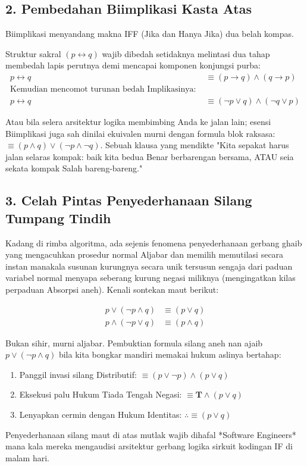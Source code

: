 \subsection{2. Pembedahan Biimplikasi Kasta Atas}

Biimplikasi menyandang makna IFF (Jika dan Hanya Jika) dua belah kompas. 

\begin{teorema}
Struktur sakral $(p \leftrightarrow q)$ wajib dibedah setidaknya melintasi dua tahap membedah lapis perutnya demi mencapai komponen konjungsi purba: 
\begin{align*}
    p \leftrightarrow q &\equiv (p \rightarrow q) \wedge (q \rightarrow p) \\
    \text{Kemudian mencomot turunan bedah Implikasinya: } & \\
    p \leftrightarrow q &\equiv (\neg p \vee q) \wedge (\neg q \vee p)
\end{align*}
\end{teorema}
Atau bila selera arsitektur logika membimbing Anda ke jalan lain; esensi Biimplikasi juga sah dinilai ekuivalen murni dengan formula blok raksasa: $\equiv (p \wedge q) \vee (\neg p \wedge \neg q)$. Sebuah klausa yang mendikte "Kita sepakat harus jalan selaras kompak: baik kita bedua Benar berbarengan bersama, ATAU seia sekata kompak Salah bareng-bareng."

\subsection{3. Celah Pintas Penyederhanaan Silang Tumpang Tindih}

Kadang di rimba algoritma, ada sejenis fenomena penyederhanaan gerbang ghaib yang mengacuhkan prosedur normal Aljabar dan memilih memutilasi secara instan manakala susunan kurungnya secara unik tersusun sengaja dari paduan variabel normal menyapa seberang kurung negasi miliknya (mengingatkan kilas perpaduan Absorpsi aneh). Kenali sontekan maut berikut:

\begin{align*}
    p \vee (\neg p \wedge q) &\equiv (p \vee q) \\
    p \wedge (\neg p \vee q) &\equiv (p \wedge q)
\end{align*}

Bukan sihir, murni aljabar. Pembuktian formula silang aneh nan ajaib $p \vee (\neg p \wedge q)$ bila kita bongkar mandiri memakai hukum aslinya bertahap:
\begin{enumerate}
    \item Panggil invasi silang Distributif: $\equiv (p \vee \neg p) \wedge (p \vee q)$
    \item Eksekusi palu Hukum Tiada Tengah Negasi: $\equiv \mathbf{T} \wedge (p \vee q)$
    \item Lenyapkan cermin dengan Hukum Identitas: $\therefore \equiv (p \vee q)$
\end{enumerate}
Penyederhanaan silang maut di atas mutlak wajib dihafal *Software Engineers* mana kala mereka mengaudisi arsitektur gerbang logika sirkuit kodingan IF di malam hari.
